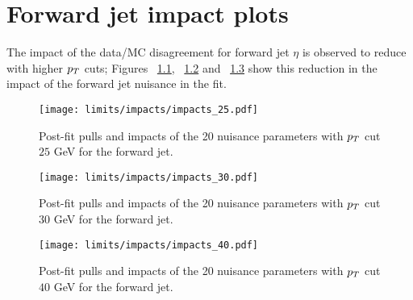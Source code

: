 \chapter{Forward jet impact plots}\label{app:forward_jet_impact}

The impact of the data/MC disagreement for forward jet $\eta$ is observed to reduce with higher $p_T$ cuts; Figures ~\ref{fig:impact25}, ~\ref{fig:impact30} and ~\ref{fig:impact40} show this reduction in the impact of the forward jet \etac nuisance in the fit.

\begin{figure} [!h]
 \centering
 \texttt{[image: limits/impacts/impacts\_25.pdf]}\\
\caption{Post-fit pulls and impacts of the 20 nuisance parameters with $p_T$ cut $25$ GeV for the forward jet.}
\label{fig:impact25}
\end{figure}

\begin{figure} [!h]
 \centering
 \texttt{[image: limits/impacts/impacts\_30.pdf]}\\
\caption{Post-fit pulls and impacts of the 20 nuisance parameters with $p_T$ cut $30$ GeV for the forward jet.}
\label{fig:impact30}
\end{figure}

\begin{figure} [!h]
 \centering
 \texttt{[image: limits/impacts/impacts\_40.pdf]}\\
\caption{Post-fit pulls and impacts of the 20 nuisance parameters with $p_T$ cut $40$ GeV for the forward jet.}
\label{fig:impact40}
\end{figure}
